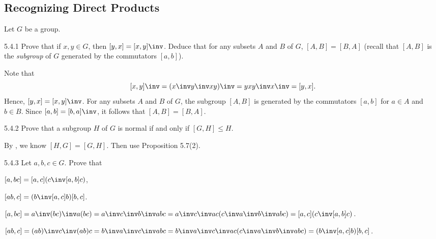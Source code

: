 \subsection{Recognizing Direct Products}

Let $G$ be a group.

\begin{exercise}{5.4.1}
    Prove that if $x, y \in G$, then $[y, x] = [x, y]\inv$.
	Deduce that for any subsets $A$ and $B$ of $G$, $[A, B] = [B, A]$ (recall that $[A, B]$ is the \emph{subgroup} of $G$ generated by the commutators $[a, b]$).
\end{exercise}

\begin{sol}
    Note that
    \[
    	[x, y]\inv = (x\inv y\inv xy)\inv = yx y\inv x\inv = [y, x].
    \]
    Hence, $[y, x] = [x, y]\inv$.
	For any subsets $A$ and $B$ of $G$, the subgroup $[A, B]$ is generated by the commutators $[a, b]$ for $a \in A$ and $b \in B$.
	Since $[a, b] = [b, a]\inv$, it follows that $[A, B] = [B, A]$.
\end{sol}

\begin{exercise}{5.4.2}
    Prove that a subgroup $H$ of $G$ is normal if and only if $[G, H] \leq H$.
\end{exercise}

\begin{sol}
    By , we know $[H, G] = [G, H]$.
	Then use Proposition 5.7(2).
\end{sol}

\begin{exercise}{5.4.3}
    Let $a, b, c \in G$.
	Prove that
    \begin{subexercises}
        \item $[a, bc] = [a, c](c\inv [a, b]c)$,
        \item $[ab, c] = (b\inv[a, c]b)[b, c]$.
    \end{subexercises}
\end{exercise}

\begin{solenum}
    \item $[a, bc] = a\inv (bc)\inv a(bc) = a\inv c\inv b\inv a b c = a\inv c\inv a c (c\inv a\inv b\inv a b c) = [a, c](c\inv [a, b]c)$.
    \item $[ab, c] = (ab)\inv c\inv (ab)c = b\inv a\inv c\inv a b c = b\inv a\inv c\inv a c (c\inv a\inv b\inv a b c) = (b\inv[a, c]b)[b, c]$. \qedhere
\end{solenum}

